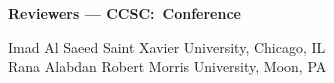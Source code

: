 \documentclass{article}
\begin{document}
\begingroup
  \centering
  \textbf{\large Reviewers --- CCSC:\confName\ Conference}\\
\endgroup

\vspace{10pt}

{\parindent0pt
Imad Al Saeed \dotfill Saint Xavier University, Chicago, IL\\
Rana Alabdan \dotfill Robert Morris University, Moon, PA\\
}
\end{document}
